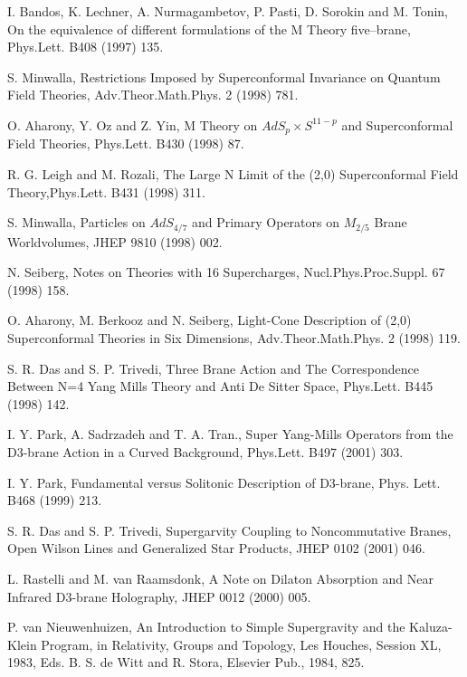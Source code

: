 \documentclass[a4paper,11pt]{article}
\begin{document}
\begin{thebibliography}{99}
I. Bandos, K. Lechner, A. Nurmagambetov, P. Pasti, D. Sorokin and
M. Tonin, On the equivalence of different formulations of the M
Theory five--brane, Phys.Lett. B408 (1997) 135.



S. Minwalla,
Restrictions Imposed by Superconformal Invariance on Quantum Field Theories,
Adv.Theor.Math.Phys. 2 (1998) 781.

O. Aharony, Y. Oz and Z. Yin,
M Theory on $AdS_p \times S^{11-p}$ and Superconformal Field Theories,
Phys.Lett. B430 (1998) 87.


R. G. Leigh and M. Rozali, The Large N Limit of the (2,0) Superconformal
Field Theory,Phys.Lett. B431 (1998) 311.


S. Minwalla,
Particles on $AdS_{4/7}$ and Primary Operators on $M_{2/5}$ Brane Worldvolumes,
JHEP 9810 (1998) 002.


N. Seiberg, Notes on Theories with 16 Supercharges, Nucl.Phys.Proc.Suppl. 67
(1998) 158.


O. Aharony, M. Berkooz and N. Seiberg,
Light-Cone Description of (2,0) Superconformal Theories in Six Dimensions,
Adv.Theor.Math.Phys. 2 (1998) 119.


S. R. Das and S. P. Trivedi, Three Brane Action and The Correspondence Between
N=4 Yang Mills Theory and Anti De Sitter Space, Phys.Lett. B445 (1998) 142.

I. Y. Park, A. Sadrzadeh and  T. A. Tran., Super Yang-Mills Operators from the
D3-brane Action in a Curved Background, Phys.Lett. B497 (2001) 303.

I. Y. Park, Fundamental versus Solitonic Description of D3-brane,
Phys. Lett. B468 (1999) 213.

S. R. Das and S. P. Trivedi, Supergarvity Coupling to
Noncommutative Branes, Open Wilson Lines and Generalized Star
Products, JHEP 0102 (2001) 046.

L. Rastelli and M. van Raamsdonk, A Note on Dilaton Absorption and
Near Infrared D3-brane Holography, JHEP 0012 (2000) 005.



P. van Nieuwenhuizen, An Introduction to Simple Supergravity and the Kaluza-Klein Program,
in Relativity, Groups and Topology, Les Houches, Session XL, 1983, Eds. B. S. de Witt and
R. Stora, Elsevier Pub., 1984, 825.



\end{thebibliography}
\end{document}
